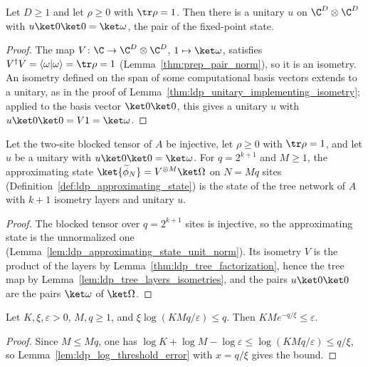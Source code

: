 \begin{lemma}
    \label{lem:ldp_tree_mera_disentangler}
    \leanok
    Let $D\ge1$ and let $\rho\ge0$ with $\tr\rho=1$. Then there is a unitary
    $u$ on $\C^D\otimes\C^D$ with $u\ket0\ket0=\ket\omega$, the pair of the
    fixed-point state.
\end{lemma}
\begin{proof}
    \leanok
    The map $V\colon\C\to\C^D\otimes\C^D$, $1\mapsto\ket\omega$, satisfies
    $V^\dagger V=\langle\omega|\omega\rangle=\tr\rho=1$
    (Lemma~\ref{thm:prep_pair_norm}), so it is an isometry. An isometry
    defined on the span of some computational basis vectors extends to a
    unitary, as in the proof of
    Lemma~\ref{thm:ldp_unitary_implementing_isometry}; applied to the basis
    vector $\ket0\ket0$, this gives a unitary $u$ with
    $u\ket0\ket0=V1=\ket\omega$.
\end{proof}

\begin{lemma}
    \label{thm:ldp_approximating_state_tree_mera}
    \leanok
    Let the two-site blocked tensor of $A$ be injective, let $\rho\ge0$ with
    $\tr\rho=1$, and let $u$ be a unitary with $u\ket0\ket0=\ket\omega$. For
    $q=2^{k+1}$ and $M\ge1$, the approximating state
    $\ket{\widetilde\phi_N}=V^{\otimes M}\ket\Omega$ on $N=Mq$ sites
    (Definition~\ref{def:ldp_approximating_state}) is the state of the tree
    network of $A$ with $k+1$ isometry layers and unitary $u$.
\end{lemma}
\begin{proof}
    \leanok
    The blocked tensor over $q=2^{k+1}$ sites is injective, so the
    approximating state is the unnormalized one
    (Lemma~\ref{lem:ldp_approximating_state_unit_norm}). Its isometry $V$ is
    the product of the layers by Lemma~\ref{thm:ldp_tree_factorization},
    hence the tree map by Lemma~\ref{lem:ldp_tree_layers_isometries}, and the
    pairs $u\ket0\ket0$ are the pairs $\ket\omega$ of $\ket\Omega$.
\end{proof}

\begin{lemma}
    \label{lem:ldp_mera_threshold_error}
    \leanok
    Let $K,\xi,\varepsilon>0$, $M,q\ge1$, and
    $\xi\log(KMq/\varepsilon)\le q$. Then $KMe^{-q/\xi}\le\varepsilon$.
\end{lemma}
\begin{proof}
    \leanok
    Since $M\le Mq$, one has $\log K+\log M-\log\varepsilon\le\log(KMq/\varepsilon)
        \le q/\xi$, so Lemma~\ref{lem:ldp_log_threshold_error} with
    $x=q/\xi$ gives the bound.
\end{proof}

